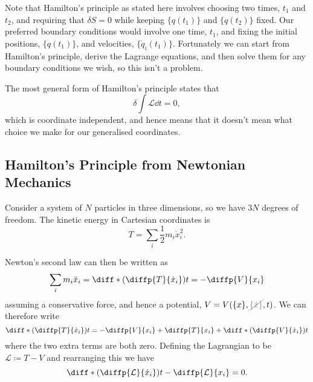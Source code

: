 \documentclass[fleqn]{NotesClass}
\newcommand*{\nodependence}[1]{\textcolor{gray}{\cancel{#1}}}
\newcommand*{\lagrangian}{\mathcal{L}}
\begin{document}
    Note that Hamilton's principle as stated here involves choosing two times, \(t_1\) and \(t_2\), and requiring that \(\delta S = 0\) while keeping \(\{q(t_1)\}\) and \(\{q(t_2)\}\) fixed.
    Our preferred boundary conditions would involve one time, \(t_1\), and fixing the initial positions, \(\{q(t_1)\}\), and velocities, \(\{\dot{q}_i(t_1)\}\).
    Fortunately we can start from Hamilton's principle, derive the Lagrange equations, and then solve them for any boundary conditions we wish, so this isn't a problem.
    
    The most general form of Hamilton's principle states that
    \begin{equation}
        \delta \int \!\! \lagrangian \dd{t} = 0,
    \end{equation}
    which is coordinate independent, and hence means that it doesn't mean what choice we make for our generalised coordinates.
    
    \subsection{Hamilton's Principle from Newtonian Mechanics}
    Consider a system of \(N\) particles in three dimensions, so we have \(3N\) degrees of freedom.
    The kinetic energy in Cartesian coordinates is
    \begin{equation}
        T = \sum_i \frac{1}{2}m_i\dot{x}_i^2.
    \end{equation}
    
    Newton's second law can then be written as
    \begin{equation}
        \sum_{i} m_i\ddot{x}_i = \diff*{\left( \diffp{T}{\dot{x}_i} \right)}{t} = -\diffp{V}{x_i}
    \end{equation}
    assuming a conservative force, and hence a potential, \(V = V(\{x\}, \nodependence{\{\dot{x}\}}, t)\).
    We can therefore write
    \begin{equation}
        \diff*{\left( \diffp{T}{\dot{x}_i} \right)}{t} = -\diffp{V}{x_i} + \diffp{T}{x_i} + \diff*{\left( \diffp{V}{\dot{x}_i} \right)}{t}
    \end{equation}
    where the two extra terms are both zero.
    Defining the Lagrangian to be \(\lagrangian \coloneqq T - V\) and rearranging this we have
    \begin{equation}
        \diff*{\left( \diffp{\lagrangian}{\dot{x}_i} \right)}{t} - \diffp{\lagrangian}{x_i} = 0.
    \end{equation}
    
\end{document}
